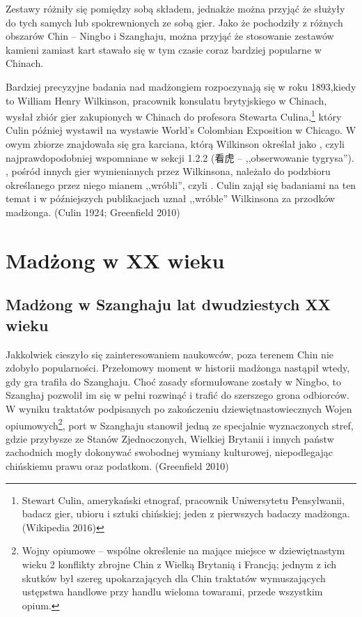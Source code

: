 Zestawy różniły się pomiędzy sobą składem, jednakże można przyjąć że służyły do
tych samych lub spokrewnionych ze sobą gier. Jako że pochodziły z różnych
obszarów Chin -- Ningbo i Szanghaju, można przyjąć że stosowanie zestawów
kamieni zamiast kart stawało się w tym czasie coraz bardziej popularne w
Chinach.

Bardziej precyzyjne badania nad madżongiem rozpoczynają się w roku 1893,kiedy to
William Henry Wilkinson, pracownik konsulatu brytyjskiego w Chinach, wysłał
zbiór gier zakupionych w Chinach do profesora Stewarta Culina,\footnote{Stewart
Culin, amerykański etnograf, pracownik Uniwersytetu Pensylwanii, badacz gier,
ubioru i sztuki chińskiej; jeden z pierwszych badaczy madżonga. (Wikipedia
2016)} który Culin później wystawił na wystawie World's Colombian Exposition w
Chicago. W owym zbiorze znajdowała się gra karciana, którą Wilkinson określał
jako , czyli najprawdopodobniej wspomniane w sekcji 1.2.2
 (看虎  -- ,,obserwowanie tygrysa'').
, pośród innych gier wymienianych przez Wilkinsona, należało do
podzbioru określanego przez niego mianem ,,wróbli'', czyli . Culin
zajął się badaniami na ten temat i w późniejszych publikacjach uznał ,,wróble''
Wilkinsona za przodków madżonga. (Culin 1924; Greenfield 2010)

\section{Madżong w XX wieku}

\subsection{Madżong w Szanghaju lat dwudziestych XX wieku}
Jakkolwiek  cieszyło się zainteresowaniem naukowców, poza
terenem Chin nie zdobyło popularności. Przełomowy moment w historii madżonga nastąpił wtedy,
gdy gra trafiła do Szanghaju. Choć zasady sformułowane zostały w Ningbo, to
Szanghaj pozwolił im się w pełni rozwinąć i trafić do szerszego grona odbiorców.
W wyniku traktatów podpisanych po zakończeniu dziewiętnastowiecznych Wojen
opiumowych\footnote{Wojny opiumowe – wspólne określenie na mające miejsce w
dziewiętnastym wieku 2 konflikty zbrojne Chin z Wielką Brytanią i Francją;
jednym z ich skutków był szereg upokarzających dla Chin traktatów wymuszających
ustępstwa handlowe przy handlu wieloma towarami, przede wszystkim opium.}, port
w Szanghaju stanowił jedną ze specjalnie wyznaczonych stref, gdzie przybysze ze
Stanów Zjednoczonych, Wielkiej Brytanii i innych państw zachodnich mogły
dokonywać swobodnej wymiany kulturowej, niepodlegając chińskiemu prawu oraz
podatkom. (Greenfield 2010)


